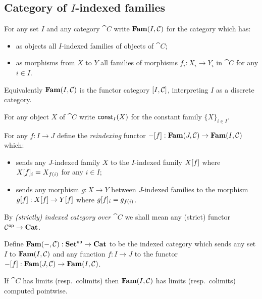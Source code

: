 \subsection{Category of $I$-indexed families}
\label{sec:fam}

\begin{definition}
\label{def:fam:Fam}
For any set $I$ and any category $\cat{C}$ write $\mathbf{Fam}(I,\mathcal{C})$ for the category which has:
\begin{itemize}
\item as objects all $I$-indexed families of objects of $\cat{C}$;
\item as morphisms from $X$ to $Y$ all families of morphisms $f_i: X_i \to Y_i$ in $\cat{C}$ for any $i \in
I$.
\end{itemize}
\end{definition}

\noindent Equivalently $\mathbf{Fam}(I,\mathcal{C})$ is the functor category $[I,\mathcal{C}]$, interpreting $I$ as a
discrete category.

\begin{definition}
For any object $X$ of $\cat{C}$ write $\mathsf{const}_I(X)$ for the constant family $\{X\}_{i \in I}$.
\end{definition}

\begin{definition}[Reindexing]
For any $f: I \to J$ define the \emph{reindexing} functor $-[f]: \mathbf{Fam}(J,\mathcal{C}) \to
\mathbf{Fam}(I,\mathcal{C})$ which:
\begin{itemize}
\item sends any $J$-indexed family $X$ to the $I$-indexed family $X[f]$ where $X[f]_i =
X_{f(i)}$ for any $i \in I$;
\item sends any morphism $g: X \to Y$ between $J$-indexed families to the morphism $g[f]:
X[f] \to Y[f]$ where $g[f]_i = g_{f(i)}$.
\end{itemize}
\end{definition}

By \emph{(strictly) indexed category over $\cat{C}$} we shall mean any (strict) functor $\mathcal{C}^{\mathsf{op}} \to
\mathbf{Cat}$.

\begin{definition}
Define $\mathbf{Fam}(-,\mathcal{C}): \mathbf{Set}^{\mathsf{op}} \to \mathbf{Cat}$ to be the indexed category which sends any set $I$ to
$\mathbf{Fam}(I,\mathcal{C})$ and any function $f: I \to J$ to the functor $-[f]: \mathbf{Fam}(J,\mathcal{C}) \to
\mathbf{Fam}(I,\mathcal{C})$.
\end{definition}

\begin{proposition}
If $\cat{C}$ has limits (resp.~colimits) then $\mathbf{Fam}(I,\mathcal{C})$ has limits (resp.~colimits) computed
pointwise.
\end{proposition}
